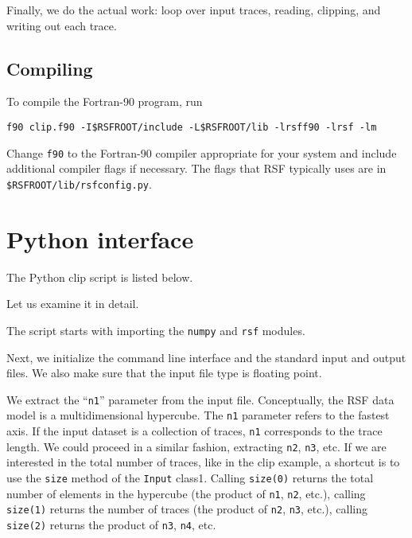 
Finally, we do the actual work: loop over input traces, reading,
clipping, and writing out each trace.

\subsection{Compiling}
To compile the Fortran-90 program, run
\begin{verbatim}
f90 clip.f90 -I$RSFROOT/include -L$RSFROOT/lib -lrsff90 -lrsf -lm
\end{verbatim}
Change \texttt{f90} to the Fortran-90 compiler appropriate for your system and
include additional compiler flags if necessary. The flags that RSF typically
uses are in \texttt{\$RSFROOT/lib/rsfconfig.py}.

\section{Python interface}

\lstset{language=python}
\renewcommand{\rsfclip}{\RSF/api/python/test/clip.py}

The Python clip script is listed below.


Let us examine it in detail. 


The script starts with importing the \texttt{numpy} and \texttt{rsf}
modules.


Next, we initialize the command line interface and the standard input and
output files. We also make sure that the input file type is floating point.


We extract the ``\texttt{n1}'' parameter from the input file.
Conceptually, the RSF data model is a multidimensional hypercube.  The
\texttt{n1} parameter refers to the fastest axis. If the input dataset
is a collection of traces, \texttt{n1} corresponds to the trace
length. We could proceed in a similar fashion, extracting \texttt{n2},
\texttt{n3}, etc. If we are interested in the total number of traces,
like in the clip example, a shortcut is to use the \texttt{size}
method of the \texttt{Input} class1.  Calling \texttt{size(0)} returns
the total number of elements in the hypercube (the product of
\texttt{n1}, \texttt{n2}, etc.), calling \texttt{size(1)} returns the
number of traces (the product of \texttt{n2}, \texttt{n3}, etc.),
calling \texttt{size(2)} returns the product of \texttt{n3},
\texttt{n4}, etc.

